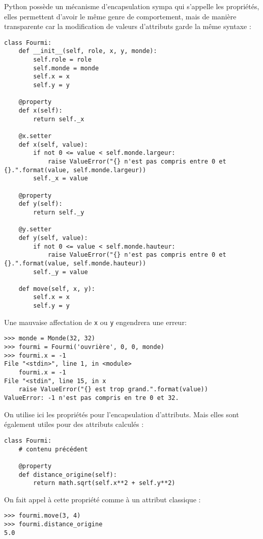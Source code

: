 Python possède un mécanisme d'encapsulation sympa qui s'appelle les propriétés, elles permettent d'avoir le même genre de comportement, mais de manière transparente car la modification de valeurs d'attributs garde la même syntaxe :

\begin{verbatim}
class Fourmi:
    def __init__(self, role, x, y, monde):
        self.role = role
        self.monde = monde
        self.x = x
        self.y = y

    @property
    def x(self):
        return self._x

    @x.setter
    def x(self, value):
        if not 0 <= value < self.monde.largeur:
            raise ValueError("{} n'est pas compris entre 0 et {}.".format(value, self.monde.largeur))    
        self._x = value
            
    @property
    def y(self):
        return self._y

    @y.setter
    def y(self, value):
        if not 0 <= value < self.monde.hauteur:
            raise ValueError("{} n'est pas compris entre 0 et {}.".format(value, self.monde.hauteur))
        self._y = value

    def move(self, x, y):
        self.x = x
        self.y = y
\end{verbatim}

Une mauvaise affectation de \texttt{x} ou \texttt{y} engendrera une erreur:

\begin{verbatim}
>>> monde = Monde(32, 32)
>>> fourmi = Fourmi('ouvrière', 0, 0, monde)
>>> fourmi.x = -1
File "<stdin>", line 1, in <module>
    fourmi.x = -1
File "<stdin", line 15, in x
    raise ValueError("{} est trop grand.".format(value))    
ValueError: -1 n'est pas compris en tre 0 et 32.
\end{verbatim}

On utilise ici les propriétés pour l'encapsulation d'attributs. Mais elles sont également utiles pour des attributs calculés :

\begin{verbatim}
class Fourmi:
    # contenu précédent

    @property
    def distance_origine(self):
        return math.sqrt(self.x**2 + self.y**2)
\end{verbatim}

On fait appel à cette propriété comme à un attribut classique :

\begin{verbatim}
>>> fourmi.move(3, 4)
>>> fourmi.distance_origine
5.0
\end{verbatim}


